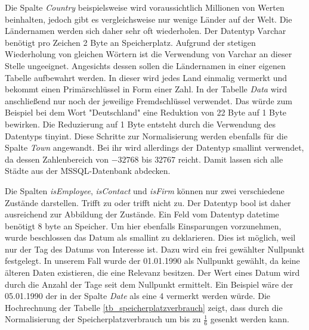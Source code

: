 Die Spalte \textit{Country} beispielsweise wird voraussichtlich Millionen von Werten beinhalten, jedoch gibt es vergleichsweise nur wenige Länder auf der Welt. Die Ländernamen werden sich daher sehr oft wiederholen. Der Datentyp Varchar benötigt pro Zeichen 2 Byte an Speicherplatz. Aufgrund der stetigen Wiederholung von gleichen Wörtern ist die Verwendung von Varchar an dieser Stelle ungeeignet. Angesichts dessen sollen die Ländernamen in einer eigenen Tabelle aufbewahrt werden. In dieser wird jedes Land einmalig vermerkt und bekommt einen Primärschlüssel in Form einer Zahl. In der Tabelle \textit{Data} wird anschließend nur noch der jeweilige Fremdschlüssel verwendet. Das würde zum Beispiel bei dem Wort "Deutschland" eine Reduktion von 22 Byte auf 1 Byte bewirken. Die Reduzierung auf 1 Byte entsteht durch die Verwendung des Datentyps tinyint. Diese Schritte zur Normalisierung werden ebenfalls für die Spalte \textit{Town} angewandt. Bei ihr wird allerdings der Datentyp smallint verwendet, da dessen Zahlenbereich von $-32768$ bis $32767$ reicht. Damit lassen sich alle Städte aus der MSSQL-Datenbank abdecken. 

Die Spalten \textit{isEmployee}, \textit{isContact} und \textit{isFirm} können nur zwei verschiedene Zustände darstellen. Trifft zu oder trifft nicht zu. Der Datentyp bool ist daher ausreichend zur Abbildung der  Zustände. Ein Feld vom Datentyp datetime benötigt 8 byte an Speicher. Um hier ebenfalls Einsparungen vorzunehmen, wurde beschlossen das Datum als smallint zu deklarieren. Dies ist möglich, weil nur der Tag des Datums von Interesse ist. Dazu wird ein frei gewählter Nullpunkt festgelegt. In unserem Fall wurde der 01.01.1990 als Nullpunkt gewählt, da keine älteren Daten existieren, die eine Relevanz besitzen. Der Wert eines Datum wird durch die Anzahl der Tage seit dem Nullpunkt ermittelt. Ein Beispiel wäre der 05.01.1990 der in der Spalte \textit{Date} als eine 4 vermerkt werden würde. Die Hochrechnung der Tabelle \ref{tb_speicherplatzverbrauch} zeigt, dass durch die Normalisierung der Speicherplatzverbrauch um bis zu $ \frac{1}{6} $ gesenkt werden kann.


